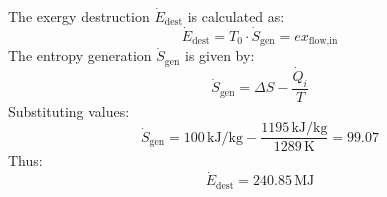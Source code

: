 The exergy destruction \( \dot{E}_{\text{dest}} \) is calculated as:  
\[
\dot{E}_{\text{dest}} = T_0 \cdot \dot{S}_{\text{gen}} = ex_{\text{flow,in}}
\]  
The entropy generation \( \dot{S}_{\text{gen}} \) is given by:  
\[
\dot{S}_{\text{gen}} = \Delta S - \frac{\dot{Q}_i}{T}
\]  
Substituting values:  
\[
\dot{S}_{\text{gen}} = 100 \, \text{kJ/kg} - \frac{1195 \, \text{kJ/kg}}{1289 \, \text{K}} = 99.07
\]  
Thus:  
\[
\dot{E}_{\text{dest}} = 240.85 \, \text{MJ}
\]